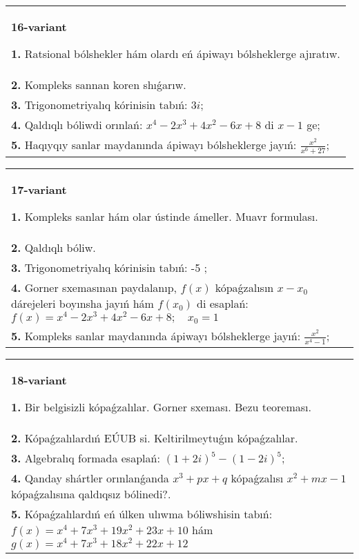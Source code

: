 \documentclass{article}
\begin{document}
\begin{tabular}{m{17cm}}
\textbf{16-variant}
\newline

\textbf{1.} Ratsional bólshekler hám olardı eń ápiwayı bólsheklerge ajıratıw. \\
\textbf{2.} Kompleks sannan koren shıǵarıw. \\
\textbf{3.} Trigonometriyalıq kórinisin tabıń: $3 i$; \\
\textbf{4.} Qaldıqlı bóliwdi orınlań: $x^4-2 x^3+4 x^2-6 x+8$ di $x-1$ ge; \\
\textbf{5.} Haqıyqıy sanlar maydanında ápiwayı bólsheklerge jayıń:  $\frac{x^2}{x^6+27}$; \\

\end{tabular}
\vspace{1cm}


\begin{tabular}{m{17cm}}
\textbf{17-variant}
\newline

\textbf{1.} Kompleks sanlar hám olar ústinde ámeller. Muavr formulası.  \\
\textbf{2.} Qaldıqlı bóliw.  \\
\textbf{3.} Trigonometriyalıq kórinisin tabıń: -5 ;  \\
\textbf{4.} Gorner sxemasınan paydalanıp, $f(x)$ kópaǵzalısın $x-x_0$ dárejeleri boyınsha jayıń hám $f\left(x_0\right)$ di esaplań: $f(x)=x^4-2 x^3+4 x^2-6 x+8 ; \quad x_0=1$ \\
\textbf{5.} Kompleks sanlar maydanında ápiwayı bólsheklerge jayıń: $\frac{x^2}{x^4-1}$; \\

\end{tabular}
\vspace{1cm}


\begin{tabular}{m{17cm}}
\textbf{18-variant}
\newline

\textbf{1.} Bir belgisizli kópaǵzalılar. Gorner sxeması. Bezu teoreması.  \\
\textbf{2.} Kópaǵzalılardıń EÚUB si. Keltirilmeytuǵın   kópaǵzalılar. \\
\textbf{3.} Algebralıq formada esaplań: $(1+2 i)^5-(1-2 i)^5$; \\
\textbf{4.} Qanday shártler orınlanǵanda $x^3+p x+q$ kópaǵzalısı $x^2+m x-1$ kópaǵzalısına qaldıqsız bólinedi?. \\
\textbf{5.} Kópaǵzalılardıń eń úlken ulıwma bóliwshisin tabıń:  $f(x)=x^4+7 x^3+19 x^2+23 x+10$ hám $g(x)=x^4+7 x^3+18 x^2+22 x+12$ \\

\end{tabular}
\vspace{1cm}
\end{document}
